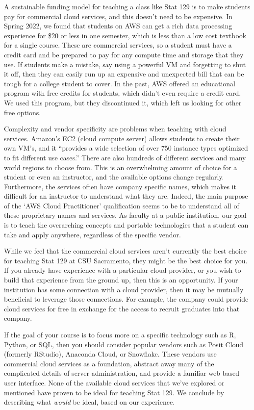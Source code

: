\documentclass[12pt]{article}
\begin{document}
A sustainable funding model for teaching a class like Stat 129 is to make students pay for commercial cloud services, and this doesn't need to be expensive.
In Spring 2022, we found that students on AWS can get a rich data processing experience for \$20 or less in one semester, which is less than a low cost textbook for a single course.
These are commercial services, so a student must have a credit card and be prepared to pay for any compute time and storage that they use.
If students make a mistake, say using a powerful VM and forgetting to shut it off, then they can easily run up an expensive and unexpected bill that can be tough for a college student to cover.
In the past, AWS offered an educational program with free credits for students, which didn't even require a credit card.
We used this program, but they discontinued it, which left us looking for other free options.

Complexity and vendor specificity are problems when teaching with cloud services.
Amazon's EC2 (cloud compute server) allows students to create their own VM's, and it ``provides a wide selection of over 750 instance types optimized to fit different use cases.''\cite{aws-ec2}
There are also hundreds of different services and many world regions to choose from.
This is an overwhelming amount of choice for a student or even an instructor, and the available options change regularly.
Furthermore, the services often have company specific names, which makes it difficult for an instructor to understand what they are.
Indeed, the main purpose of the `AWS Cloud Practitioner' qualification seems to be to understand all of these proprietary names and services.
As faculty at a public institution, our goal is to teach the overarching concepts and portable technologies that a student can take and apply anywhere, regardless of the specific vendor.

While we feel that the commercial cloud services aren't currently the best choice for teaching Stat 129 at CSU Sacramento, they might be the best choice for you.
If you already have experience with a particular cloud provider, or you wish to build that experience from the ground up, then this is an opportunity. 
If your institution has some connection with a cloud provider, then it may be mutually beneficial to leverage those connections.
For example, the company could provide cloud services for free in exchange for the access to recruit graduates into that company.

If the goal of your course is to focus more on a specific technology such as R, Python, or SQL, then you should consider popular vendors such as Posit Cloud (formerly RStudio), Anaconda Cloud, or Snowflake.
These vendors use commercial cloud services as a foundation, abstract away many of the complicated details of server administration, and provide a familiar web based user interface.
None of the available cloud services that we've explored or mentioned have proven to be ideal for teaching Stat 129.
We conclude by describing what \emph{would} be ideal, based on our experience.
\end{document}
